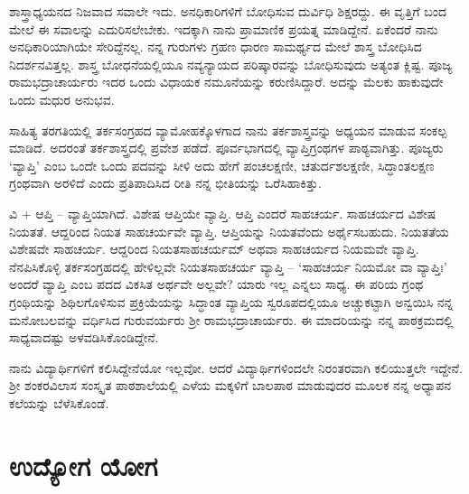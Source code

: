 {ಶಾಸ್ತ್ರಾಧ್ಯಯನದ ನಿಜವಾದ ಸವಾಲೇ ಇದು.  ಅನಧಿಕಾರಿಗಳಿಗೆ ಬೋಧಿಸುವ ದುರ್ವಿಧಿ ಶಿಕ್ಷರದ್ದು.  ಈ ವೃತ್ತಿಗೆ ಬಂದ ಮೇಲೆ ಈ ಸವಾಲನ್ನು ಎದುರಿಸಲೇಬೇಕು.  ಇದಕ್ಕಾಗಿ ನಾನು ಪ್ರಾಮಾಣಿಕ ಪ್ರಯತ್ನ ಮಾಡಿದ್ದೇನೆ.  ಏಕೆಂದರೆ ನಾನು ಅನಧಿಕಾರಿಯಾಗಿಯೇ ಸೇರಿದ್ದೆನಲ್ಲ.  ನನ್ನ ಗುರುಗಳು ಗ್ರಹಣ ಧಾರಣ ಸಾಮರ್ಥ್ಯದ ಮೇಲೆ ಶಾಸ್ತ್ರ ಬೋಧಿಸಿದ ನಿದರ್ಶನವಿತ್ತಲ್ಲ.  ಶಾಸ್ತ್ರ ಬೋಧನೆಯಲ್ಲಿಯೂ ನವ್ಯನ್ಯಾಯದ ಪರಿಷ್ಕಾರವನ್ನು ಬೋಧಿಸುವುದು ಅತ್ಯಂತ ಕ್ಲಿಷ್ಟ.  ಪೂಜ್ಯ ರಾಮಭದ್ರಾಚಾರ್ಯರು ಇದರ ಒಂದು ವಿಧಾಯಕ ನಮೂನೆಯನ್ನು ಕರುಣಿಸಿದ್ದಾರೆ. ಅದನ್ನು ಮೆಲಕು ಹಾಕುವುದೇ ಒಂದು ಮಧುರ ಅನುಭವ.  

ಸಾಹಿತ್ಯ ತರಗತಿಯಲ್ಲಿ ತರ್ಕಸಂಗ್ರಹದ ವ್ಯಾಮೋಹಕ್ಕೊಳಗಾದ ನಾನು ತರ್ಕಶಾಸ್ತ್ರವನ್ನು ಅಧ್ಯಯನ ಮಾಡುವ ಸಂಕಲ್ಪ ಮಾಡಿದೆ.  ಅದರಂತೆ ತರ್ಕಶಾಸ್ತ್ರದಲ್ಲಿ ಪ್ರವೇಶ ಪಡೆದೆ.  ಪೂರ್ವಭಾಗದಲ್ಲಿ ವ್ಯಾಪ್ತಿಗ್ರಂಥಗಳ ಪಾಠ್ಯವಾಗಿತ್ತು.  ಪೂಜ್ಯರು ‘ವ್ಯಾಪ್ತಿ’ ಎಂಬ ಒಂದೇ ಒಂದು ಪದವನ್ನು ಸೀಳಿ ಅದು ಹೇಗೆ ಪಂಚಲಕ್ಷಣೀ, ಚತುರ್ದಶಲಕ್ಷಣೀ, ಸಿದ್ಧಾಂತಲಕ್ಷಣ ಗ್ರಂಥವಾಗಿ ಅರಳಿದೆ ಎಂದು ಪ್ರತಿಪಾದಿಸಿದ ರೀತಿ ನನ್ನ ಭೀತಿಯನ್ನು ಒರೆಸಿಹಾಕಿತ್ತು.  

ವಿ + ಆಪ್ತಿ – ವ್ಯಾಪ್ತಿಯಾಗಿದೆ.  ವಿಶೇಷ ಆಪ್ತಿಯೇ ವ್ಯಾಪ್ತಿ.  ಆಪ್ತಿ ಎಂದರೆ ಸಾಹಚರ್ಯ.  ಸಾಹಚರ್ಯದ ವಿಶೇಷ ನಿಯತತೆ.  ಆದ್ದರಿಂದ ನಿಯತ ಸಾಹಚರ್ಯವೇ ವ್ಯಾಪ್ತಿ. ಆಪ್ತಿಯನ್ನು ನಿಯತವೆಂದು ಅರ್ಥೈಸಬಹುದು.  ನಿಯತತೆಯ ವಿಶೇಷವೇ ಸಾಹಚರ್ಯ.  ಆದ್ದರಿಂದ ನಿಯತಸಾಹಚರ್ಯಮ್ ಅಥವಾ ಸಾಹಚರ್ಯದ ನಿಯಮವೇ ವ್ಯಾಪ್ತಿ.  ನೆನಪಿಸಿಕೊಳ್ಳಿ ತರ್ಕಸಂಗ್ರಹದಲ್ಲಿ ಹೇಳಿಲ್ಲವೇ ನಿಯತಸಾಹಚರ್ಯ ವ್ಯಾಪ್ತಿ – ‘ಸಾಹಚರ್ಯ ನಿಯಮೋ ವಾ ವ್ಯಾಪ್ತಿಃ’ ಅಂದರೆ ವ್ಯಾಪ್ತಿ ಎಂಬ ಪದದ ವಿಕಸಿತ ಅರ್ಥವೇ  ಅಲ್ಲವೇ? ಯಾರು ಇಲ್ಲ ಎನ್ನಲು ಸಾಧ್ಯ. ಈ ಪರಿಯ ಗ್ರಂಥ ಗ್ರಂಥಿಯನ್ನು ಶಿಥಿಲಗೊಳಿಸುವ ಪ್ರಕ್ರಿಯೆಯನ್ನು ಸಿದ್ಧಾಂತ ವ್ಯಾಪ್ತಿಯ ಸ್ವರೂಪದಲ್ಲಿಯೂ ಅಚ್ಚುಕಟ್ಟಾಗಿ ಅನ್ವಯಿಸಿ ನನ್ನ ಮನೋಬಲವನ್ನು ವರ್ಧಿಸಿದ ಗುರುವರ್ಯರು ಶ್ರೀ ರಾಮಭದ್ರಾಚಾರ್ಯರು.  ಈ ಮಾದರಿಯನ್ನು ನನ್ನ ಪಾಠಕ್ರಮದಲ್ಲಿ ಸಾಧ್ಯವಾದಷ್ಟು ಅಳವಡಿಸಿಕೊಂಡಿದ್ದೇನೆ.

ನಾನು ವಿದ್ಯಾರ್ಥಿಗಳಿಗೆ ಕಲಿಸಿದ್ದೇನೆಯೋ ಇಲ್ಲವೋ.  ಆದರೆ ವಿದ್ಯಾರ್ಥಿಗಳಿಂದಲೇ ನಿರಂತರವಾಗಿ ಕಲಿಯುತ್ತಲೇ ಇದ್ದೇನೆ.  ಶ್ರೀ ಶಂಕರವಿಲಾಸ ಸಂಸ್ಕೃತ ಪಾಠಶಾಲೆಯಲ್ಲಿ ಎಳೆಯ ಮಕ್ಕಳಿಗೆ ಬಾಲಪಾಠ ಮಾಡುವುದರ ಮೂಲಕ ನನ್ನ ಅಧ್ಯಾಪನ ಕಲೆಯನ್ನು ಬೆಳೆಸಿಕೊಂಡೆ.

\section*{ಉದ್ಯೋಗ ಯೋಗ}

}
